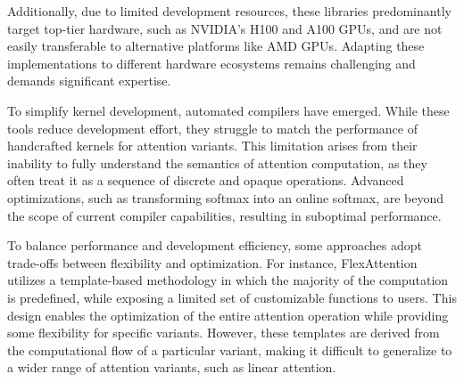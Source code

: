 Additionally, due to limited development resources, these libraries predominantly target top-tier hardware, such as NVIDIA's H100 and A100 GPUs, and are not easily transferable to alternative platforms like AMD GPUs. Adapting these implementations to different hardware ecosystems remains challenging and demands significant expertise.

To simplify kernel development, automated compilers\cite{24pytorch2, tvm2018, ansor, xla, shi2023welder, tensorrt} have emerged. While these tools reduce development effort, they struggle to match the performance of handcrafted kernels for attention variants. This limitation arises from their inability to fully understand the semantics of attention computation, as they often treat it as a sequence of discrete and opaque operations. Advanced optimizations, such as transforming softmax into an online softmax, are beyond the scope of current compiler capabilities, resulting in suboptimal performance.

To balance performance and development efficiency, some approaches adopt trade-offs between flexibility and optimization. For instance, FlexAttention~\cite{dong2024flexattentionprogrammingmodel} utilizes a template-based methodology in which the majority of the computation is predefined, while exposing a limited set of customizable functions to users. This design enables the optimization of the entire attention operation while providing some flexibility for specific variants. However, these templates are derived from the computational flow of a particular variant, making it difficult to generalize to a wider range of attention variants, such as linear attention.





